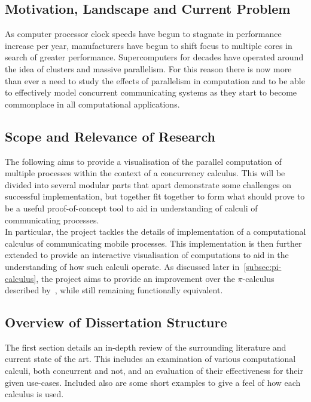\subsection{Motivation, Landscape and Current Problem}
    As computer processor clock speeds have begun to stagnate in performance increase per year, manufacturers have begun to shift focus to multiple cores in search of greater performance.
    Supercomputers for decades have operated around the idea of clusters and massive parallelism.
    For this reason there is now more than ever a need to study the effects of parallelism in computation and to be able to effectively model concurrent communicating systems as they start to become commonplace in all computational applications.


\subsection{Scope and Relevance of Research}
    The following aims to provide a visualisation of the parallel computation of multiple processes within the context of a concurrency calculus.
    This will be divided into several modular parts that apart demonstrate some challenges on successful implementation, but together fit together to form what should prove to be a useful proof-of-concept tool to aid in understanding of calculi of communicating processes.\\

    In particular, the project tackles the details of implementation of a computational calculus of communicating mobile processes.
    This implementation is then further extended to provide an interactive visualisation of computations to aid in the understanding of how such calculi operate.
    As discussed later in~\ref{subsec:pi-calculus}, the project aims to provide an improvement over the $\pi$-calculus described by~\cite{pi-calculus}, while still remaining functionally equivalent.


\subsection{Overview of Dissertation Structure}
    The first section details an in-depth review of the surrounding literature and current state of the art.
    This includes an examination of various computational calculi, both concurrent and not, and an evaluation of their effectiveness for their given use-cases.
    Included also are some short examples to give a feel of how each calculus is used.\\

